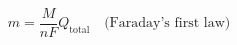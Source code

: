 \documentclass[preview]{standalone}
\begin{document}
\[m = \frac{M}{nF} Q_\text{total} \quad \text{(Faraday's first law)}\]
\end{document}

